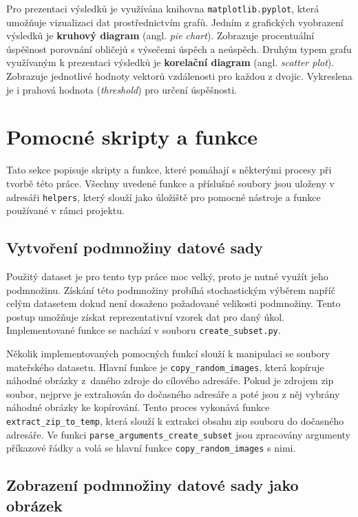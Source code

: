 \noindent Pro prezentaci výsledků je využívána knihovna \texttt{matplotlib.pyplot}, která umožňuje vizualizaci dat prostřednictvím grafů. Jedním z grafických vyobrazení výsledků je \textbf{kruhový diagram} (angl. \textit{pie chart}). Zobrazuje procentuální úspěšnost porovnání obličejů s výsečemi úspěch a neúspěch. Druhým typem grafu využívaným k prezentaci výsledků je \textbf{korelační diagram} (angl. \textit{scatter plot}). Zobrazuje jednotlivé hodnoty vektorů vzdálenosti pro každou z dvojic. Vykreslena je i prahová hodnota (\textit{threshold}) pro určení úspěšnosti.

\section{Pomocné skripty a funkce}
\label{helpers}

Tato sekce popisuje skripty a funkce, které pomáhají s některými procesy při tvorbě této práce. Všechny uvedené funkce a příslušné soubory jsou uloženy v adresáři \texttt{helpers}, který slouží jako úložiště pro pomocné nástroje a funkce používané v rámci projektu.

\subsection*{Vytvoření podmnožiny datové sady}

Použitý dataset je pro tento typ práce moc velký, proto je nutné využít jeho podmnožinu. Získání této podmnožiny probíhá stochastickým výběrem napříč celým datasetem dokud není dosaženo požadované velikosti podmnožiny. Tento postup umožňuje získat reprezentativní vzorek dat pro daný úkol. Implementované funkce se nachází v souboru \texttt{create\_subset.py}.

Několik implementovaných pomocných funkcí slouží k manipulaci se soubory mateřského datasetu. Hlavní funkce je \texttt{copy\_random\_images}, která kopíruje náhodné obrázky z~daného zdroje do cílového adresáře. Pokud je zdrojem zip soubor, nejprve je extrahován do dočasného adresáře a poté jsou z něj vybrány náhodné obrázky ke kopírování. Tento proces vykonává funkce \texttt{extract\_zip\_to\_temp}, která slouží k extrakci obsahu zip souboru do dočasného adresáře. Ve funkci \texttt{parse\_arguments\_create\_subset} jsou zpracovány argumenty příkazové řádky a volá se hlavní funkce \texttt{copy\_random\_images} s nimi.

\subsection*{Zobrazení podmnožiny datové sady jako obrázek}

